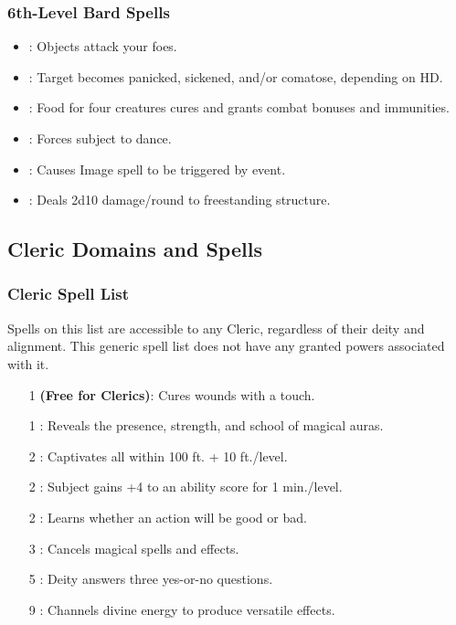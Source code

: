\subsubsection{6th-Level Bard Spells}
\begin{itemize}
\item {}: Objects attack your foes.
\item {}: Target becomes panicked, sickened, and/or comatose, depending on HD.
\item {}: Food for four creatures cures and grants combat bonuses and immunities.
\item {}: Forces subject to dance.
\item {}: Causes Image spell to be triggered by event.
\item {}: Deals 2d10 damage/round to freestanding structure.
\end{itemize}
\subsection{Cleric Domains and Spells}
\label{sec:ClericDomains}
\subsubsection{Cleric Spell List}
\label{Domain:General}
Spells on this list are accessible to any Cleric, regardless of their deity and alignment. This generic spell list does not have any granted powers associated with it.
\begin{itemize}
  \item[1]  \textbf{(Free for Clerics)}: Cures wounds with a touch.
  \item[1] : Reveals the presence, strength, and school of magical auras.
  \item[2] : Captivates all within 100 ft. + 10 ft./level.
  \item[2] : Subject gains +4 to an ability score for 1 min./level.
  \item[2] : Learns whether an action will be good or bad.
  \item[3] : Cancels magical spells and effects.
  \item[5] : Deity answers three yes-or-no questions.
  \item[9] : Channels divine energy to produce versatile effects.
\end{itemize}
